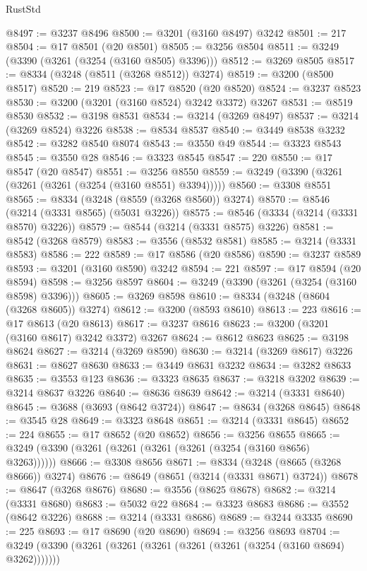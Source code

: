 \begin{lexlean}{RustStd}
\begin{coremodule}
{\begin{coremodule}
{{{{{{{{{{{{{{{{{{{{{{{{{@8497 := @3237 @8496
@8500 := @3201 (@3160 @8497) @3242
@8501 := 217
@8504 := @17 @8501 (@20 @8501)
@8505 := @3256 @8504
@8511 := @3249 (@3390 (@3261 (@3254 (@3160 @8505) @3396)))
@8512 := @3269 @8505
@8517 := @8334 (@3248 (@8511 (@3268 @8512)) @3274)
@8519 := @3200 (@8500 @8517)
@8520 := 219
@8523 := @17 @8520 (@20 @8520)
@8524 := @3237 @8523
@8530 := @3200 (@3201 (@3160 @8524) @3242 @3372) @3267
@8531 := @8519 @8530
@8532 := @3198 @8531
@8534 := @3214 (@3269 @8497)
@8537 := @3214 (@3269 @8524) @3226
@8538 := @8534 @8537
@8540 := @3449 @8538 @3232
@8542 := @3282 @8540 @8074
@8543 := @3550 @49
@8544 := @3323 @8543
@8545 := @3550 @28
@8546 := @3323 @8545
@8547 := 220
@8550 := @17 @8547 (@20 @8547)
@8551 := @3256 @8550
@8559 := @3249 (@3390 (@3261 (@3261 (@3261 (@3254 (@3160 @8551) @3394)))))
@8560 := @3308 @8551
@8565 := @8334 (@3248 (@8559 (@3268 @8560)) @3274)
@8570 := @8546 (@3214 (@3331 @8565) (@5031 @3226))
@8575 := @8546 (@3334 (@3214 (@3331 @8570) @3226))
@8579 := @8544 (@3214 (@3331 @8575) @3226)
@8581 := @8542 (@3268 @8579)
@8583 := @3556 (@8532 @8581)
@8585 := @3214 (@3331 @8583)
@8586 := 222
@8589 := @17 @8586 (@20 @8586)
@8590 := @3237 @8589
@8593 := @3201 (@3160 @8590) @3242
@8594 := 221
@8597 := @17 @8594 (@20 @8594)
@8598 := @3256 @8597
@8604 := @3249 (@3390 (@3261 (@3254 (@3160 @8598) @3396)))
@8605 := @3269 @8598
@8610 := @8334 (@3248 (@8604 (@3268 @8605)) @3274)
@8612 := @3200 (@8593 @8610)
@8613 := 223
@8616 := @17 @8613 (@20 @8613)
@8617 := @3237 @8616
@8623 := @3200 (@3201 (@3160 @8617) @3242 @3372) @3267
@8624 := @8612 @8623
@8625 := @3198 @8624
@8627 := @3214 (@3269 @8590)
@8630 := @3214 (@3269 @8617) @3226
@8631 := @8627 @8630
@8633 := @3449 @8631 @3232
@8634 := @3282 @8633
@8635 := @3553 @123
@8636 := @3323 @8635
@8637 := @3218 @3202
@8639 := @3214 @8637 @3226
@8640 := @8636 @8639
@8642 := @3214 (@3331 @8640)
@8645 := @3688 (@3693 (@8642 @3724))
@8647 := @8634 (@3268 @8645)
@8648 := @3545 @28
@8649 := @3323 @8648
@8651 := @3214 (@3331 @8645)
@8652 := 224
@8655 := @17 @8652 (@20 @8652)
@8656 := @3256 @8655
@8665 := @3249 (@3390 (@3261 (@3261 (@3261 (@3261 (@3254 (@3160 @8656) @3263))))))
@8666 := @3308 @8656
@8671 := @8334 (@3248 (@8665 (@3268 @8666)) @3274)
@8676 := @8649 (@8651 (@3214 (@3331 @8671) @3724))
@8678 := @8647 (@3268 @8676)
@8680 := @3556 (@8625 @8678)
@8682 := @3214 (@3331 @8680)
@8683 := @5032 @22
@8684 := @3323 @8683
@8686 := @3552 (@8642 @3226)
@8688 := @3214 (@3331 @8686)
@8689 := @3244 @3335
@8690 := 225
@8693 := @17 @8690 (@20 @8690)
@8694 := @3256 @8693
@8704 := @3249 (@3390 (@3261 (@3261 (@3261 (@3261 (@3261 (@3254 (@3160 @8694) @3262)))))))
}}}}}}}}}}}}}}}}}}}}}}}}}
\end{coremodule}}
\end{coremodule}
\end{lexlean}
